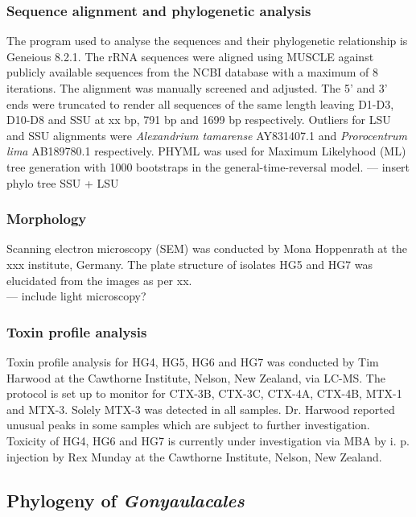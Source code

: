 \documentclass[12pt]{article}
\begin{document}
\subsubsection{Sequence alignment and phylogenetic analysis}
The program used to analyse the sequences and their phylogenetic relationship is Geneious 8.2.1.
The rRNA sequences were aligned using MUSCLE against publicly available sequences from the NCBI database with a maximum of 8 iterations. The alignment was manually screened and adjusted. The 5' and 3' ends were truncated to render all sequences of the same length leaving D1-D3, D10-D8 and SSU at xx bp, 791 bp and 1699 bp respectively. Outliers for LSU and SSU alignments were \emph{Alexandrium tamarense} AY831407.1 and \emph{Prorocentrum lima} AB189780.1 respectively.
PHYML was used for Maximum Likelyhood (ML) tree generation with 1000 bootstraps in the general-time-reversal model.
--- insert phylo tree SSU + LSU

\subsubsection{Morphology}
Scanning electron microscopy (SEM) was conducted by Mona Hoppenrath at the xxx institute, Germany. The plate structure of isolates HG5 and HG7 was elucidated from the images as per xx.\\
--- include light microscopy?

\subsubsection{Toxin profile analysis}
Toxin profile analysis for HG4, HG5, HG6 and HG7 was conducted by Tim Harwood at the Cawthorne Institute, Nelson, New Zealand, via LC-MS. The protocol is set up to monitor for CTX-3B, CTX-3C, CTX-4A, CTX-4B, MTX-1 and MTX-3. Solely MTX-3 was detected in all samples. Dr. Harwood reported unusual peaks in some samples which are subject to further investigation. \\
Toxicity of HG4, HG6 and HG7 is currently under investigation via MBA by i. p. injection by Rex Munday at the Cawthorne Institute, Nelson, New Zealand.
 

\subsection{Phylogeny of \emph{Gonyaulacales}}
\end{document}
